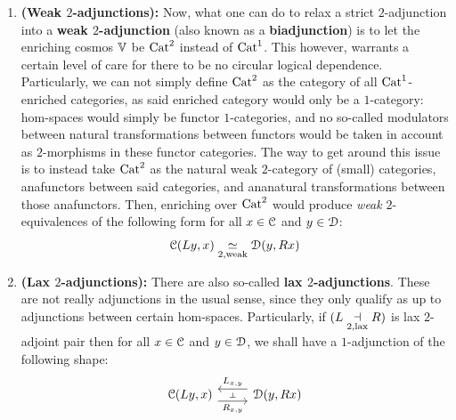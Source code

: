\begin{remark}
\begin{enumerate}
                        \item \textbf{(Weak $2$-adjunctions):} Now, what one can do to relax a strict $2$-adjunction into a \textbf{weak $2$-adjunction} (also known as a \textbf{biadjunction}) is to let the enriching cosmos $\mathbb{V}$ be $\mathrm{Cat}^2$ instead of $\mathrm{Cat}^1$. This however, warrants a certain level of care for there to be no circular logical dependence. Particularly, we can not simply define $\mathrm{Cat}^2$ as the category of all $\mathrm{Cat}^1$-enriched categories, as said enriched category would only be a $1$-category: hom-spaces would simply be functor $1$-categories, and no so-called modulators between natural transformations between functors would be taken in account as $2$-morphisms in these functor categories. The way to get around this issue is to instead take $\mathrm{Cat}^2$ as the natural weak $2$-category of (small) categories, anafunctors between said categories, and ananatural transformations between those anafunctors. Then, enriching over $\mathrm{Cat}^2$ would produce \textit{weak} $2$-equivalences of the following form for all $x \in \mathcal{C}$ and $y \in \mathcal{D}$:
                            $$\mathcal{C}(Ly, x) \underset{2, \mathrm{weak}}{\simeq} \mathcal{D}(y, Rx)$$
                        \item \textbf{(Lax $2$-adjunctions):} There are also so-called \textbf{lax $2$-adjunctions}. These are not really adjunctions in the usual sense, since they only qualify as  up to adjunctions between certain hom-spaces. Particularly, if $(L \underset{2, \mathrm{lax}}{\dashv} R)$ is lax $2$-adjoint pair then for all $x \in \mathcal{C}$ and $y \in \mathcal{D}$, we shall have a $1$-adjunction of the following shape:
                            $$
                                \begin{tikzcd}
                                	{\C(Ly, x)} & {\D(y, Rx)}
                                	\arrow[""{name=0, anchor=center, inner sep=0}, "{R_{x, y}}"', shift right=2, from=1-1, to=1-2]
                                	\arrow[""{name=1, anchor=center, inner sep=0}, "{L_{x, y}}"', shift right=2, from=1-2, to=1-1]
                                	\arrow["\dashv"{anchor=center, rotate=-90}, draw=none, from=1, to=0]
                                \end{tikzcd}
                            $$
                    \end{enumerate}
                \end{remark}
